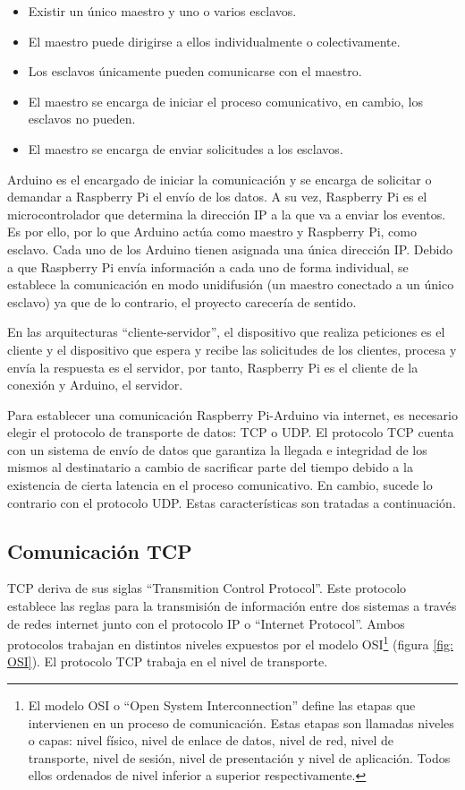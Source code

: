 \begin{itemize}
    \item Existir un único maestro y uno o varios esclavos.
    \item El maestro puede dirigirse a ellos individualmente o colectivamente.
    \item Los esclavos únicamente pueden comunicarse con el maestro.
    \item El maestro se encarga de iniciar el proceso comunicativo, en cambio, los esclavos no pueden.
    \item El maestro se encarga de enviar solicitudes a los esclavos.
\end{itemize}

Arduino es el encargado de iniciar la comunicación y se encarga de solicitar o demandar a Raspberry Pi el envío de los datos. A su vez, Raspberry Pi es el microcontrolador que determina la dirección IP a la que va a enviar los eventos. Es por ello, por lo que Arduino actúa como maestro y Raspberry Pi, como esclavo. Cada uno de los Arduino tienen asignada una única dirección IP. Debido a que Raspberry Pi envía información a cada uno de forma individual, se establece la comunicación en modo unidifusión (un maestro conectado a un único esclavo) ya que de lo contrario, el proyecto carecería de sentido.

En las arquitecturas ``cliente-servidor'', el dispositivo que realiza peticiones es el cliente y el dispositivo que espera y recibe las solicitudes de los clientes, procesa y envía la respuesta es el servidor, por tanto, Raspberry Pi es el cliente de la conexión y Arduino, el servidor.

Para establecer una comunicación Raspberry Pi-Arduino via internet, es necesario elegir el protocolo de transporte de datos: TCP o UDP. El protocolo TCP cuenta con un sistema de envío de datos que garantiza la llegada e integridad de los mismos al destinatario a cambio de sacrificar parte del tiempo debido a la existencia de cierta latencia en el proceso comunicativo. En cambio, sucede lo contrario con el protocolo UDP. Estas características son tratadas a continuación.


\subsection{Comunicación TCP} \label{s2_3_2}

TCP deriva de sus siglas ``Transmition Control Protocol''. Este protocolo establece las reglas para la transmisión de información entre dos sistemas a través de redes internet junto con el protocolo IP o ``Internet Protocol''. Ambos protocolos trabajan en distintos niveles expuestos por el modelo OSI\footnote{El modelo OSI o ``Open System Interconnection'' define las etapas que intervienen en un proceso de comunicación. Estas etapas son llamadas niveles o capas: nivel físico, nivel de enlace de datos, nivel de red, nivel de transporte, nivel de sesión, nivel de presentación y nivel de aplicación. Todos ellos ordenados de nivel inferior a superior respectivamente.} (figura \ref{fig: OSI}). El protocolo TCP trabaja en el nivel de transporte.

